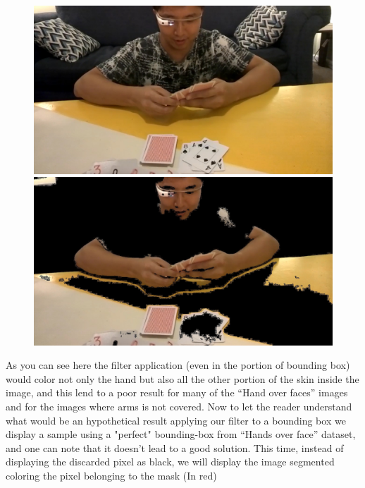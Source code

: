 \begin{center}
    \begin{figure}[!htb]
        \begin{minipage}{0.5\textwidth}
            \centering
            \includegraphics[scale=0.21]{images/unused_seg/8.jpg}
        \end{minipage}
        \begin{minipage}{0.5\textwidth}
            \centering
            \includegraphics[scale=0.21]{images/unused_seg/8m.jpg} 
        \end{minipage}
    \end{figure}
\end{center}
As you can see here the filter application (even in the portion of bounding box) would color not only the hand but also all the other portion of the skin inside the image, and this lend to a poor result for many of the “Hand over faces” images and for the images where arms is not covered.
\break
\newline
Now to let the reader understand what would be an hypothetical result applying our filter to a bounding box we display a sample using a "perfect" bounding-box from “Hands over face” dataset, and one can note that it doesn’t lead to a good solution. This time, instead of displaying the discarded pixel as black, we will display the image segmented coloring the pixel belonging to the mask (In red)  
